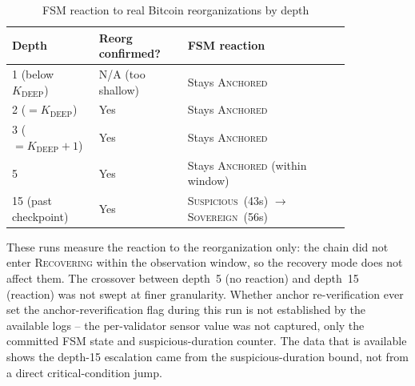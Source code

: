 \begin{table}[h]
\caption{FSM reaction to real Bitcoin reorganizations by depth}
\label{tab:reorg}
\centering
\scriptsize
\begin{tabular}{@{}p{0.16\linewidth}p{0.24\linewidth}p{0.44\linewidth}@{}}
\toprule
\textbf{Depth} & \textbf{Reorg confirmed?} & \textbf{FSM reaction} \\
\midrule
1 (below $K_{\text{DEEP}}$) & N/A (too shallow) & Stays \textsc{Anchored} \\
2 ($=K_{\text{DEEP}}$)      & Yes & Stays \textsc{Anchored} \\
3 ($=K_{\text{DEEP}}{+}1$)  & Yes & Stays \textsc{Anchored} \\
5                           & Yes & Stays \textsc{Anchored} (within window) \\
15 (past checkpoint)        & Yes & \textsc{Suspicious}~(43s) $\to$ \textsc{Sovereign}~(56s) \\
\bottomrule
\end{tabular}
\end{table}

These runs measure the reaction to the reorganization only: the chain did not
enter \textsc{Recovering} within the observation window, so the recovery mode
does not affect them. The crossover between depth~5 (no reaction) and depth~15 (reaction) was
not swept at finer granularity. Whether anchor re-verification ever set the
anchor-reverification flag during this run is not established by the
available logs -- the per-validator sensor value was not captured, only the
committed FSM state and suspicious-duration counter. The data that is
available shows the depth-15 escalation came from the suspicious-duration
bound, not from a direct critical-condition jump.

\FloatBarrier
